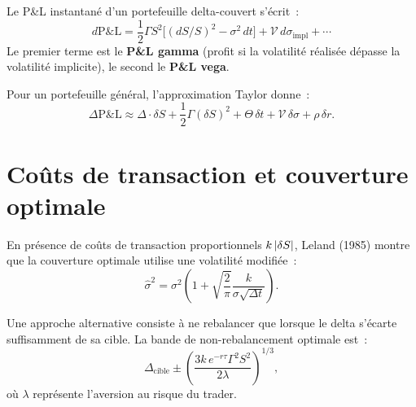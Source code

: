 \begin{theoreme}
Le P\&L instantan\'e d'un portefeuille delta-couvert s'\'ecrit~:
\[
    d\text{P\&L} = \frac{1}{2}\Gamma S^2\bigl[(dS/S)^2 - \sigma^2\,dt\bigr]
                 + \mathcal{V}\,d\sigma_{\text{impl}} + \cdots
\]
Le premier terme est le \textbf{P\&L gamma} (profit si la volatilit\'e
r\'ealis\'ee d\'epasse la volatilit\'e implicite), le second le
\textbf{P\&L vega}.
\end{theoreme}

\begin{formules}[title=\textbf{Approximation Taylor du P\&L}]
Pour un portefeuille g\'en\'eral, l'approximation Taylor donne~:
\[
    \Delta\text{P\&L} \approx \Delta\cdot\delta S
    + \frac{1}{2}\Gamma(\delta S)^2 + \Theta\,\delta t
    + \mathcal{V}\,\delta\sigma + \rho\,\delta r.
\]
\end{formules}

\section{Co\^uts de transaction et couverture optimale}

\begin{theoreme}
En pr\'esence de co\^uts de transaction proportionnels $k\left| \delta S \right|$,
Leland (1985) montre que la couverture optimale utilise une volatilit\'e
modifi\'ee~:
\[
    \hat{\sigma}^2 = \sigma^2\left(1 + \sqrt{\frac{2}{\pi}}
    \frac{k}{\sigma\sqrt{\Delta t}}\right).
\]
\end{theoreme}

\begin{proposition}
Une approche alternative consiste \`a ne rebalancer que lorsque le delta
s'\'ecarte suffisamment de sa cible. La bande de non-rebalancement
optimale est~:
\[
    \Delta_{\text{cible}} \pm \left(\frac{3k\,e^{-r\tau}\Gamma^2 S^2}
    {2\lambda}\right)^{1/3},
\]
o\`u $\lambda$ repr\'esente l'aversion au risque du trader.
\end{proposition}

